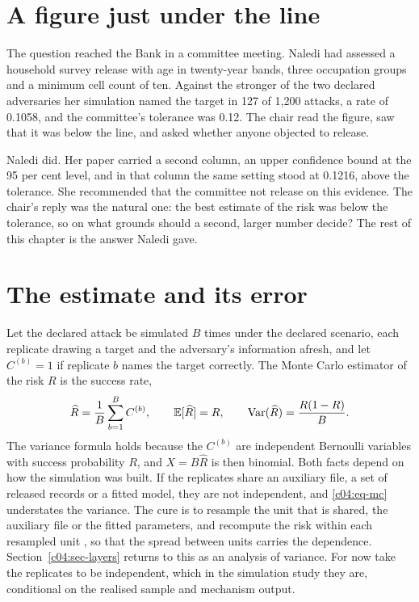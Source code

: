 \section{A figure just under the line}

The question reached the Bank in a committee meeting. Naledi had assessed a household
survey release with age in twenty-year bands, three occupation groups and a minimum cell
count of ten. Against the stronger of the two declared adversaries her simulation named
the target in 127 of 1,200 attacks, a rate of 0.1058, and the committee's tolerance was
0.12.
The chair read the figure, saw that it was below the line, and asked whether anyone
objected to release.

Naledi did. Her paper carried a second column, an upper confidence bound at the 95 per
cent level, and in that column the same setting stood at 0.1216, above the tolerance.
She recommended that the committee not release on this evidence. The chair's reply was
the natural one: the best estimate of the risk was below the tolerance, so on what
grounds should a second, larger number decide? The rest of this chapter is the answer
Naledi gave.

\section{The estimate and its error}

Let the declared attack be simulated $B$ times under the declared scenario, each
replicate drawing a target and the adversary's information afresh, and let
$C^{(b)} = 1$ if replicate $b$ names the target correctly. The Monte Carlo estimator of
the risk $R$ is the success rate,
\begin{equation}\label{c04:eq-mc}
\widehat{R} = \frac{1}{B}\sum_{b=1}^{B} C^{(b)}, \qquad
\mathbb{E}[\widehat{R}] = R, \qquad
\mathrm{Var}(\widehat{R}) = \frac{R(1-R)}{B}.
\end{equation}
The variance formula holds because the $C^{(b)}$ are independent Bernoulli variables
with success probability $R$, and $X = B\widehat{R}$ is then binomial. Both facts
depend on how the simulation was built. If the replicates share an auxiliary file, a
set of released records or a fitted model, they are not independent, and
\eqref{c04:eq-mc} understates the variance. The cure is to resample the unit that is
shared, the auxiliary file or the fitted parameters, and recompute the risk within each
resampled unit \citep{efron1993}, so that the spread between units carries the
dependence. Section~\ref{c04:sec-layers} returns to this as an analysis of variance. For
now take the replicates to be independent, which in the simulation study they are,
conditional on the realised sample and mechanism output.

